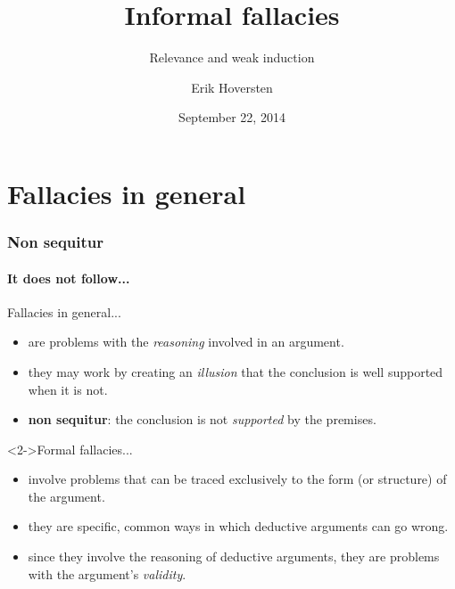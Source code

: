 \documentclass[10pt,letterpaper,xcolor=dvipsnames]{beamer}
\title{Informal fallacies}
\subtitle{Relevance and weak induction}
\author[Hoversten]{Erik Hoversten}
\institute[lrp-f14]{Logic, reason, and persuasion: fall 2014 \\ Rutgers University}
\date[09/22/2014]{September 22, 2014}
\begin{document}
\begin{frame}
\titlepage
\end{frame}

\section{Fallacies in general}

\begin{frame}
\frametitle{Non sequitur}
\framesubtitle{It does not follow...}

\begin{block}{Fallacies in general...}
  \begin{itemize}
    \item are problems with the \textit{reasoning} involved in an argument.
    \item they may work by creating an \textit{illusion} that the conclusion is well supported when it is not.
    \item \textbf{non sequitur}: the conclusion is not \textit{supported} by the premises.
  \end{itemize}
\end{block}

\begin{block}<2->{Formal fallacies...}
  \begin{itemize}
    \item involve problems that can be traced exclusively to the form (or structure) of the argument.
    \item they are specific, common ways in which deductive arguments can go wrong.
    \item since they involve the reasoning of deductive arguments, they are problems with the argument's \textit{validity}.
  \end{itemize}
\end{block}

\end{frame}
\end{document}
